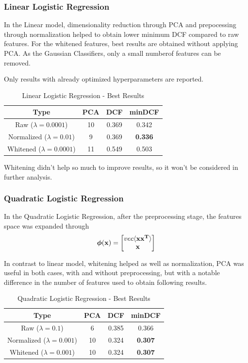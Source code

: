 \documentclass[12pt, twocolumn]{article}
\begin{document}
\subsubsection{Linear Logistic Regression}

In the Linear model, dimensionality reduction through PCA and prepocessing through normalization
helped to obtain lower minimum DCF compared to raw features.
For the whitened features, best results are obtained without applying PCA.
As the Gaussian Classifiers, only a small numberof features can be removed.

Only results with already optimized hyperparameters are reported.
\begin{table}[H]
    \centering
    \tiny
        \begin{tabular}{||c|c|c|c||}
            \hline
            Type & PCA & DCF & minDCF \\
            \hline
            \hline
            Raw ($\lambda = 0.0001$) & 10 & 0.369 &  0.342  \\
            Normalized ($\lambda = 0.01$) & 9 & 0.369 &  {\bf 0.336}  \\
            Whitened ($\lambda = 0.0001$) & 11 & 0.549 &  0.503  \\
            \hline
    \end{tabular}
    \caption{Linear Logistic Regression - Best Results}
\end{table}

Whitening didn't help so much to improve results, so it won't be considered in further analysis.
\subsubsection{Quadratic Logistic Regression}

In the Quadratic Logistic Regression, after the preprocessing stage, the features space
was expanded through 
$$ {\bf \boldsymbol{\phi}(x)} = {
    \begin{bmatrix}
    vec\langle{\bf xx^T}\rangle\\
    {\bf x}
    \end{bmatrix}}
$$ 

In contrast to linear model, whitening helped as well as normalization, PCA
was useful in both cases, with and without preprocessing, but with a notable difference
in the number of features used to obtain following results.

\begin{table}[H]
    \tiny
    \centering
        \begin{tabular}{||c|c|c|c||}
            \hline
            Type & PCA & DCF & minDCF \\
            \hline
            \hline
            Raw ($\lambda = 0.1$) & 6 & 0.385 &  0.366  \\
            Normalized ($\lambda = 0.001$) & 10 & 0.324 &  {\bf 0.307}  \\
            Whitened ($\lambda = 0.001$) & 10 & 0.324 &  {\bf 0.307}  \\
            \hline
    \end{tabular}
    \caption{Quadratic Logistic Regression - Best Results}
\end{table}
\end{document}
